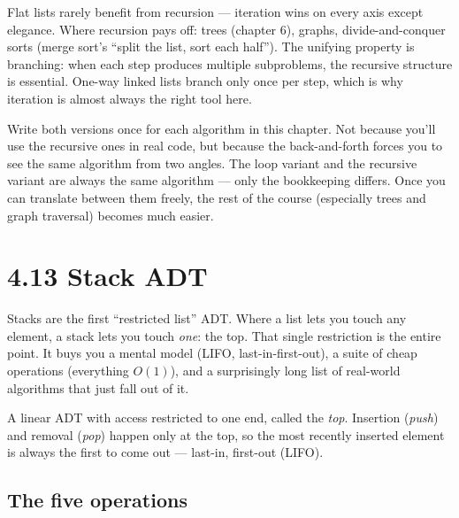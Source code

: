 \documentclass[11pt]{article}
\begin{document}
\begin{notebox}
Flat lists rarely benefit from recursion --- iteration wins on
every axis except elegance. Where recursion pays off: trees
(chapter 6), graphs, divide-and-conquer sorts (merge sort's
``split the list, sort each half''). The unifying property is
branching: when each step produces multiple subproblems, the
recursive structure is essential. One-way linked lists branch
only once per step, which is why iteration is almost always the
right tool here.
\end{notebox}

\begin{ideabox}
Write both versions once for each algorithm in this chapter.
Not because you'll use the recursive ones in real code, but
because the back-and-forth forces you to see the same algorithm
from two angles. The loop variant and the recursive variant are
always the same algorithm --- only the bookkeeping differs.
Once you can translate between them freely, the rest of the
course (especially trees and graph traversal) becomes much
easier.
\end{ideabox}

\section{4.13 Stack ADT}

Stacks are the first ``restricted list'' ADT. Where a list lets
you touch any element, a stack lets you touch \emph{one}: the
top. That single restriction is the entire point. It buys you a
mental model (LIFO, last-in-first-out), a suite of cheap
operations (everything $O(1)$), and a surprisingly long list of
real-world algorithms that just fall out of it.

\begin{defnbox}[Stack]
A linear ADT with access restricted to one end, called the
\emph{top}. Insertion (\emph{push}) and removal (\emph{pop})
happen only at the top, so the most recently inserted element is
always the first to come out --- last-in, first-out (LIFO).
\end{defnbox}

\subsection*{The five operations}
\end{document}
